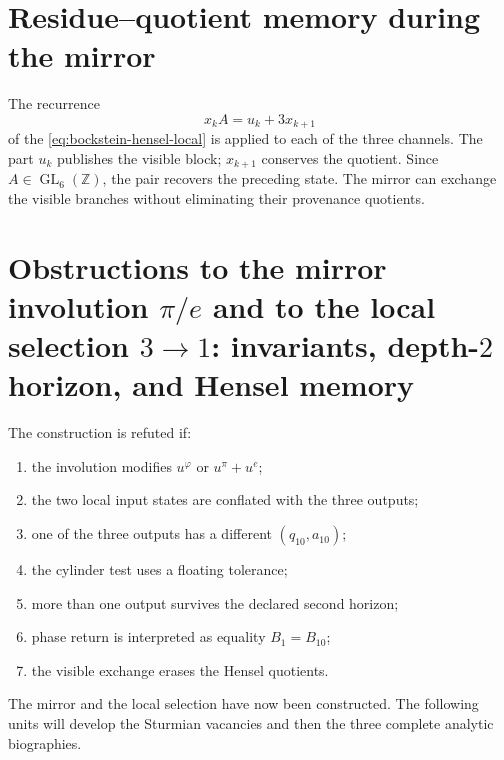 \section{Residue--quotient memory during the mirror}

The recurrence
\[
 x_kA=u_k+3x_{k+1}
\]
of the \cref{eq:bockstein-hensel-local} is applied to each of the three
channels. The part \(u_k\) publishes the visible block; \(x_{k+1}\) conserves
the quotient. Since \(A\in\operatorname{GL}_6(\mathbb Z)\), the pair recovers
the preceding state. The mirror can exchange the visible branches without
eliminating their provenance quotients.

\section{Obstructions to the mirror involution \(\pi/e\) and to the local selection \(3\to1\): invariants, depth-\(2\) horizon, and Hensel memory}

\begin{criterion}
The construction is refuted if:
\begin{enumerate}
 \item the involution modifies \(u^\varphi\) or \(u^\pi+u^e\);
 \item the two local input states are conflated with the three outputs;
 \item one of the three outputs has a different \((q_{10},a_{10})\);
 \item the cylinder test uses a floating tolerance;
 \item more than one output survives the declared second horizon;
 \item phase return is interpreted as equality \(B_1=B_{10}\);
 \item the visible exchange erases the Hensel quotients.
\end{enumerate}
\end{criterion}

The mirror and the local selection have now been constructed. The following
units will develop the Sturmian vacancies and then the three
complete analytic biographies.
